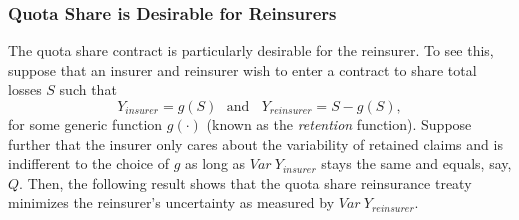 \documentclass[]{book}
\newenvironment{Shaded}{\begin{snugshade}}{\end{snugshade}}
\newcommand{\KeywordTok}[1]{\textcolor[rgb]{0.13,0.29,0.53}{\textbf{#1}}}
\newcommand{\DataTypeTok}[1]{\textcolor[rgb]{0.13,0.29,0.53}{#1}}
\newcommand{\DecValTok}[1]{\textcolor[rgb]{0.00,0.00,0.81}{#1}}
\newcommand{\FloatTok}[1]{\textcolor[rgb]{0.00,0.00,0.81}{#1}}
\newcommand{\StringTok}[1]{\textcolor[rgb]{0.31,0.60,0.02}{#1}}
\newcommand{\OperatorTok}[1]{\textcolor[rgb]{0.81,0.36,0.00}{\textbf{#1}}}
\newcommand{\NormalTok}[1]{#1}
\theoremstyle{definition}
\theoremstyle{definition}
\theoremstyle{definition}
\theoremstyle{remark}
\begin{document}
\hypertarget{toggleQuotaShare}{}
\begin{Shaded}
\end{Shaded}

\subsubsection{Quota Share is Desirable for
Reinsurers}\label{quota-share-is-desirable-for-reinsurers}

The quota share contract is particularly desirable for the reinsurer. To
see this, suppose that an insurer and reinsurer wish to enter a contract
to share total losses \(S\) such that
\[Y_{insurer}=g(S) \ \ \ \text{and} \ \ \ \ Y_{reinsurer}=S-g(S),\] for
some generic function \(g(\cdot)\) (known as the \emph{retention}
function). Suppose further that the insurer only cares about the
variability of retained claims and is indifferent to the choice of \(g\)
as long as \(Var~Y_{insurer}\) stays the same and equals, say, \(Q\).
Then, the following result shows that the quota share reinsurance treaty
minimizes the reinsurer's uncertainty as measured by
\(Var~Y_{reinsurer}\).
\end{document}
